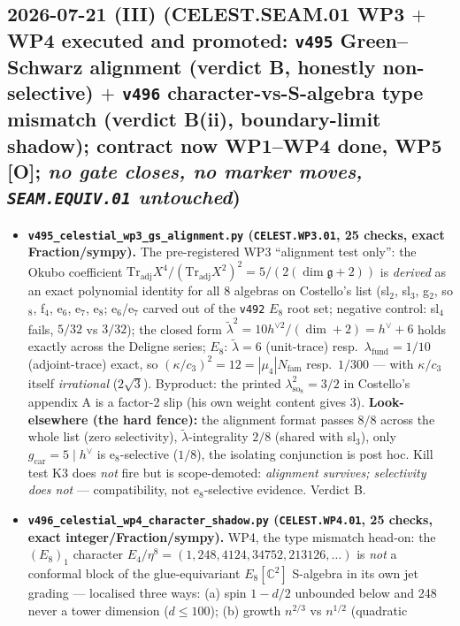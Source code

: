 \documentclass[11pt]{article}
\providecommand{\mO}{\textbf{[O]}}\providecommand{\mX}{\textbf{[X]}}
\begin{document}
\subsection*{2026-07-21 (III) (CELEST.SEAM.01 WP3 $+$ WP4 executed and promoted: \texttt{v495} Green--Schwarz alignment (verdict B, honestly non-selective) $+$ \texttt{v496} character-vs-S-algebra type mismatch (verdict B(ii), boundary-limit shadow); contract now WP1--WP4 done, WP5 \mO; \emph{no gate closes, no marker moves, \texttt{SEAM.EQUIV.01} untouched})}
\begin{itemize}[leftmargin=1.5em]
\item \textbf{\texttt{v495\_celestial\_wp3\_gs\_alignment.py} (\texttt{CELEST.WP3.01}, 25 checks, exact
Fraction/sympy).} The pre-registered WP3 ``alignment test only'': the Okubo coefficient
$\mathrm{Tr}_{\mathrm{adj}}X^4/(\mathrm{Tr}_{\mathrm{adj}}X^2)^2=5/(2(\dim\mathfrak g{+}2))$ is
\emph{derived} as an exact polynomial identity for all 8 algebras on Costello's list (sl$_2$, sl$_3$,
g$_2$, so$_8$, f$_4$, e$_6$, e$_7$, e$_8$; e$_6$/e$_7$ carved out of the \texttt{v492} $E_8$ root set;
negative control: sl$_4$ fails, $5/32$ vs $3/32$); the closed form
$\tilde\lambda^2=10h^{\vee2}/(\dim{+}2)=h^\vee{+}6$ holds exactly across the Deligne series; $E_8$:
$\tilde\lambda=6$ (unit-trace) resp.\ $\lambda_{\mathrm{fund}}=1/10$ (adjoint-trace) exact, so
$(\kappa/c_3)^2=12=|\mu_4|N_{\mathrm{fam}}$ resp.\ $1/300$ --- with $\kappa/c_3$ itself
\emph{irrational} ($2\sqrt3$). Byproduct: the printed $\lambda^2_{\mathrm{so}_8}=3/2$ in Costello's
appendix A is a factor-2 slip (his own weight content gives 3). \textbf{Look-elsewhere (the hard
fence):} the alignment format passes $8/8$ across the whole list (zero selectivity),
$\tilde\lambda$-integrality $2/8$ (shared with sl$_3$), only $g_{\mathrm{car}}{=}5\mid h^\vee$ is
e$_8$-selective ($1/8$), the isolating conjunction is post hoc. Kill test K3 does \emph{not} fire but is
scope-demoted: \emph{alignment survives; selectivity does not} --- compatibility, not e$_8$-selective
evidence. Verdict B.
\item \textbf{\texttt{v496\_celestial\_wp4\_character\_shadow.py} (\texttt{CELEST.WP4.01}, 25 checks,
exact integer/Fraction/sympy).} WP4, the type mismatch head-on: the $(E_8)_1$ character
$E_4/\eta^8=(1,248,4124,34752,213126,\dots)$ is \emph{not} a conformal block of the glue-equivariant
$E_8[\mathbb C^2]$ S-algebra in its own jet grading --- localised three ways: (a) spin $1-d/2$ unbounded
below and 248 never a tower dimension ($d\le100$); (b) growth $n^{2/3}$ vs $n^{1/2}$ (quadratic

\end{itemize}
\end{document}
